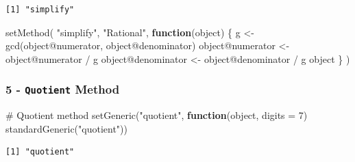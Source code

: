 \documentclass[
  12pt,
]{article}
\newenvironment{Shaded}{\begin{snugshade}}{\end{snugshade}}
\newcommand{\AttributeTok}[1]{\textcolor[rgb]{0.40,0.45,0.13}{#1}}
\newcommand{\CommentTok}[1]{\textcolor[rgb]{0.37,0.37,0.37}{#1}}
\newcommand{\ControlFlowTok}[1]{\textcolor[rgb]{0.00,0.23,0.31}{\textbf{#1}}}
\newcommand{\DecValTok}[1]{\textcolor[rgb]{0.68,0.00,0.00}{#1}}
\newcommand{\FunctionTok}[1]{\textcolor[rgb]{0.28,0.35,0.67}{#1}}
\newcommand{\NormalTok}[1]{\textcolor[rgb]{0.00,0.23,0.31}{#1}}
\newcommand{\OtherTok}[1]{\textcolor[rgb]{0.00,0.23,0.31}{#1}}
\newcommand{\SpecialCharTok}[1]{\textcolor[rgb]{0.37,0.37,0.37}{#1}}
\newcommand{\StringTok}[1]{\textcolor[rgb]{0.13,0.47,0.30}{#1}}
\begin{document}
\begin{verbatim}
[1] "simplify"
\end{verbatim}

\begin{Shaded}
\begin{Highlighting}[]
\FunctionTok{setMethod}\NormalTok{(}
  \StringTok{"simplify"}\NormalTok{,}
  \StringTok{"Rational"}\NormalTok{,}
  \ControlFlowTok{function}\NormalTok{(object) \{}
\NormalTok{    g }\OtherTok{\textless{}{-}} \FunctionTok{gcd}\NormalTok{(object}\SpecialCharTok{@}\NormalTok{numerator, object}\SpecialCharTok{@}\NormalTok{denominator)}
\NormalTok{    object}\SpecialCharTok{@}\NormalTok{numerator }\OtherTok{\textless{}{-}}\NormalTok{ object}\SpecialCharTok{@}\NormalTok{numerator }\SpecialCharTok{/}\NormalTok{ g}
\NormalTok{    object}\SpecialCharTok{@}\NormalTok{denominator }\OtherTok{\textless{}{-}}\NormalTok{ object}\SpecialCharTok{@}\NormalTok{denominator }\SpecialCharTok{/}\NormalTok{ g}
\NormalTok{    object}
\NormalTok{  \}}
\NormalTok{)}
\end{Highlighting}
\end{Shaded}

\subsubsection{\texorpdfstring{5 - \texttt{Quotient}
Method}{5 - Quotient Method}}\label{quotient-method}

\begin{Shaded}
\begin{Highlighting}[]
\CommentTok{\# Quotient method}
\FunctionTok{setGeneric}\NormalTok{(}\StringTok{"quotient"}\NormalTok{, }\ControlFlowTok{function}\NormalTok{(object, }\AttributeTok{digits =} \DecValTok{7}\NormalTok{) }\FunctionTok{standardGeneric}\NormalTok{(}\StringTok{"quotient"}\NormalTok{))}
\end{Highlighting}
\end{Shaded}

\begin{verbatim}
[1] "quotient"
\end{verbatim}
\end{document}
